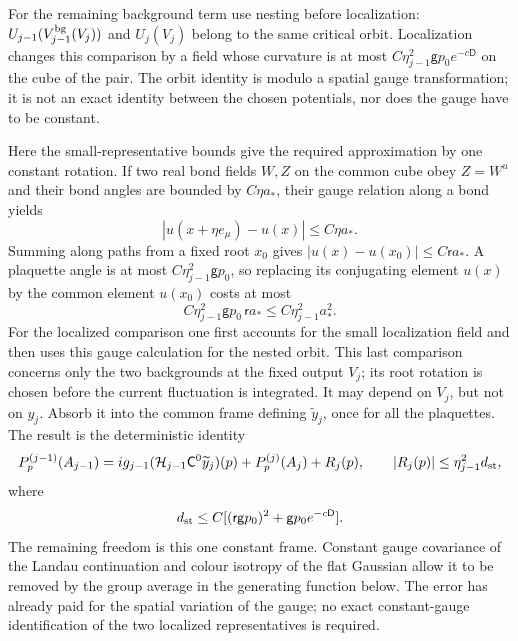 \documentclass[11pt,letterpaper,reqno]{amsart}
\theoremstyle{definition}
\theoremstyle{remark}
\begin{document}
For the remaining background term use nesting before
localization:
$U_{j-1}(V_{j-1}^{\rm bg}(V_j))$ and $U_j(V_j)$ belong to
the same critical orbit. Localization changes this comparison
by a field whose curvature is at most
$C\eta_{j-1}^2\mathsf g p_0e^{-c\mathsf D}$ on the cube
of the pair. The orbit identity is modulo a spatial gauge
transformation; it is not an exact identity between the chosen
potentials, nor does the gauge have to be constant.

Here the small-representative bounds give the required
approximation by one constant rotation. If two real bond
fields $W,Z$ on the common cube obey $Z=W^u$ and their bond
angles are bounded by $C\eta a_*$, their gauge relation along
a bond yields
\[
 |u(x+\eta e_\mu)-u(x)|\le C\eta a_*.
\]
Summing along paths from a fixed root $x_0$ gives
$|u(x)-u(x_0)|\le C\mathsf r a_*$. A plaquette angle is
at most $C\eta_{j-1}^2\mathsf g p_0$, so replacing its
conjugating element $u(x)$ by the common element $u(x_0)$
costs at most
\[
 C\eta_{j-1}^2\mathsf g p_0\,\mathsf r a_*
                     \le C\eta_{j-1}^2a_*^2.
\]
For the localized comparison one first accounts for the small
localization field and then uses this gauge calculation for
the nested orbit. This last comparison concerns only the two
backgrounds at the fixed output $V_j$; its root rotation is
chosen before the current fluctuation is integrated. It may
depend on $V_j$, but not on $y_j$. Absorb it into the common
frame defining $\widetilde y_j$, once for all the plaquettes.
The result is the deterministic identity
\begin{equation}\label{eq:inserted-plaquette-lowering}
 P_p^{(j-1)}(A_{j-1})
 =ig_{j-1}(\mathcal H_{j-1}\mathsf C^0\widetilde y_j)(p)
                         +P_p^{(j)}(A_j)+R_j(p),
 \qquad |R_j(p)|\le\eta_{j-1}^2d_{\rm st},
\end{equation}
where
\[
 d_{\rm st}\le C[(\mathsf r\mathsf g p_0)^2
                          +\mathsf g p_0e^{-c\mathsf D}].
\]
The remaining freedom is this one constant frame. Constant
gauge covariance of the Landau continuation and colour
isotropy of the flat Gaussian allow it to be removed by the
group average in the generating function below. The error
has already paid for the spatial variation of the gauge;
no exact constant-gauge identification of the two localized
representatives is required.
\end{document}

